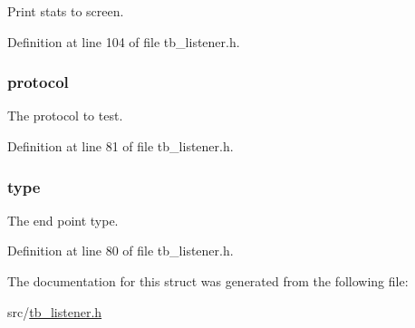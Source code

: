 Print stats to screen. 



Definition at line 104 of file tb\-\_\-listener.\-h.

\hypertarget{structtb__test__params__t_a0d2276cd987e688180eedab183cd503e}{
\subsubsection[{protocol}]{ protocol}}\label{structtb__test__params__t_a0d2276cd987e688180eedab183cd503e}


The protocol to test. 



Definition at line 81 of file tb\-\_\-listener.\-h.

\hypertarget{structtb__test__params__t_a3fefae1824d77098e05df5bac09c1791}{
\subsubsection[{type}]{ type}}\label{structtb__test__params__t_a3fefae1824d77098e05df5bac09c1791}


The end point type. 



Definition at line 80 of file tb\-\_\-listener.\-h.



The documentation for this struct was generated from the following file\-:\begin{DoxyCompactItemize}
\item 
src/\hyperlink{tb__listener_8h}{tb\-\_\-listener.\-h}\end{DoxyCompactItemize}

